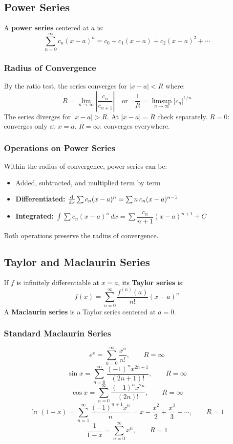 \documentclass[11pt, letterpaper]{article}
\theoremstyle{plain}
\begin{document}
\subsection{Power Series}

A \textbf{power series} centered at $a$ is:
\[
    \sum_{n=0}^{\infty} c_n(x-a)^n = c_0 + c_1(x-a) + c_2(x-a)^2 + \cdots
\]

\subsubsection*{Radius of Convergence}
By the ratio test, the series converges for $|x - a| < R$ where:
\[
    R = \lim_{n\to\infty}\left|\frac{c_n}{c_{n+1}}\right|
    \quad \text{or} \quad
    \frac{1}{R} = \limsup_{n\to\infty}|c_n|^{1/n}
\]
The series diverges for $|x-a| > R$. At $|x-a| = R$ check separately.
$R = 0$: converges only at $x=a$. $R = \infty$: converges everywhere.

\subsubsection*{Operations on Power Series}
Within the radius of convergence, power series can be:
\begin{itemize}
    \item Added, subtracted, and multiplied term by term
    \item \textbf{Differentiated:}
          $\dv{}{x}\sum c_n(x-a)^n = \sum n\,c_n(x-a)^{n-1}$
    \item \textbf{Integrated:}
          $\int\sum c_n(x-a)^n\,dx = \sum \dfrac{c_n}{n+1}(x-a)^{n+1} + C$
\end{itemize}
Both operations preserve the radius of convergence.


\subsection{Taylor and Maclaurin Series}

If $f$ is infinitely differentiable at $x = a$, its \textbf{Taylor series} is:
\[
    f(x) = \sum_{n=0}^{\infty} \frac{f^{(n)}(a)}{n!}(x-a)^n
\]
A \textbf{Maclaurin series} is a Taylor series centered at $a = 0$.

\subsubsection*{Standard Maclaurin Series}
\[
    e^x = \sum_{n=0}^{\infty}\frac{x^n}{n!}, \qquad R = \infty
\]
\[
    \sin x = \sum_{n=0}^{\infty}\frac{(-1)^n x^{2n+1}}{(2n+1)!}, \qquad R = \infty
\]
\[
    \cos x = \sum_{n=0}^{\infty}\frac{(-1)^n x^{2n}}{(2n)!}, \qquad R = \infty
\]
\[
    \ln(1+x) = \sum_{n=1}^{\infty}\frac{(-1)^{n+1}x^n}{n}
    = x - \frac{x^2}{2} + \frac{x^3}{3} - \cdots, \qquad R = 1
\]
\[
    \frac{1}{1-x} = \sum_{n=0}^{\infty} x^n, \qquad R = 1
\]
\end{document}
